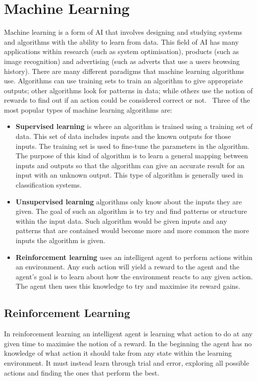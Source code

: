 \chapter{Machine Learning}\label{machine learning}
Machine learning is a form of \ac{AI} that involves designing and studying systems and algorithms with the ability to learn from data. This field of AI has many applications within research (such as system optimisation), products (such as image recognition) and advertising (such as adverts that use a users browsing history). There are many different paradigms that machine learning algorithms use. Algorithms can use training sets to train an algorithm to give appropriate outputs; other algorithms look for patterns in data; while others use the notion of rewards to find out if an action could be considered correct or not.~\cite{alpaydin2010introduction} Three of the most popular types of machine learning algorithms are:
\begin{itemize}
  \item \textbf{Supervised learning} is where an algorithm is trained using a training set of data. This set of data includes inputs and the known outputs for those inputs. The training set is used to fine-tune the parameters in the algorithm. The purpose of this kind of algorithm is to learn a general mapping between inputs and outputs so that the algorithm can give an accurate result for an input with an unknown output. This type of algorithm is generally used in classification systems.  
  \item \textbf{Unsupervised learning} algorithms only know about the inputs they are given. The goal of such an algorithm is to try and find patterns or structure within the input data. Such algorithm would be given inputs and any patterns that are contained would become more and more common the more inputs the algorithm is given.
  \item \textbf{Reinforcement learning} uses an intelligent agent to perform actions within an environment. Any such action will yield a reward to the agent and the agent's goal is to learn about how the environment reacts to any given action. The agent then uses this knowledge to try and maximise its reward gains.
\end{itemize}
\section{Reinforcement Learning}\label{reinforcement learning}
In reinforcement learning an intelligent agent is learning what action to do at any given time to maximise the notion of a reward. In the beginning the agent has no knowledge of what action it should take from any state within the learning environment. It must instead learn through trial and error, exploring all possible actions and finding the ones that perform the best.

